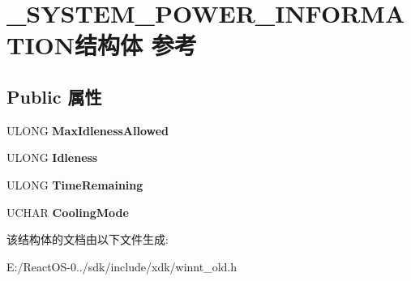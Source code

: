 \hypertarget{struct___s_y_s_t_e_m___p_o_w_e_r___i_n_f_o_r_m_a_t_i_o_n}{}\section{\+\_\+\+S\+Y\+S\+T\+E\+M\+\_\+\+P\+O\+W\+E\+R\+\_\+\+I\+N\+F\+O\+R\+M\+A\+T\+I\+O\+N结构体 参考}
\label{struct___s_y_s_t_e_m___p_o_w_e_r___i_n_f_o_r_m_a_t_i_o_n}
\subsection*{Public 属性}
\begin{DoxyCompactItemize}
\item 
\mbox{\label{struct___s_y_s_t_e_m___p_o_w_e_r___i_n_f_o_r_m_a_t_i_o_n_ab49b51560c27feff5c0f57c719eca1b6}} 
U\+L\+O\+NG {\bfseries Max\+Idleness\+Allowed}
\item 
\mbox{\label{struct___s_y_s_t_e_m___p_o_w_e_r___i_n_f_o_r_m_a_t_i_o_n_a17abe0594a638865dd807cd06ae1221f}} 
U\+L\+O\+NG {\bfseries Idleness}
\item 
\mbox{\label{struct___s_y_s_t_e_m___p_o_w_e_r___i_n_f_o_r_m_a_t_i_o_n_add4fa22cee57ded196074cc0f73bf068}} 
U\+L\+O\+NG {\bfseries Time\+Remaining}
\item 
\mbox{\label{struct___s_y_s_t_e_m___p_o_w_e_r___i_n_f_o_r_m_a_t_i_o_n_a1480095aa9ce680037e13ebab4758718}} 
U\+C\+H\+AR {\bfseries Cooling\+Mode}
\end{DoxyCompactItemize}


该结构体的文档由以下文件生成\+:\begin{DoxyCompactItemize}
\item 
E\+:/\+React\+O\+S-\/0../sdk/include/xdk/winnt\+\_\+old.\+h\end{DoxyCompactItemize}
